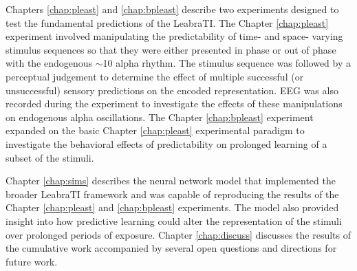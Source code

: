 \documentclass[dwyatte_dissertation.tex]{subfiles}
\begin{document}
Chapters \ref{chap:pleast} and \ref{chap:bpleast} describe two experiments designed to test the fundamental predictions of the LeabraTI. The Chapter \ref{chap:pleast} experiment involved manipulating the predictability of time- and space- varying stimulus sequences so that they were either presented in phase or out of phase with the endogenous $\sim$10 alpha rhythm. The stimulus sequence was followed by a perceptual judgement to determine the effect of multiple successful (or unsuccessful) sensory predictions on the encoded representation. EEG was also recorded during the experiment to investigate the effects of these manipulations on endogenous alpha oscillations. The Chapter \ref{chap:bpleast} experiment expanded on the basic Chapter \ref{chap:pleast} experimental paradigm to investigate the behavioral effects of predictability on prolonged learning of a subset of the stimuli.

Chapter \ref{chap:sims} describes the neural network model that implemented the broader LeabraTI framework and was capable of reproducing the results of the Chapter \ref{chap:pleast} and \ref{chap:bpleast} experiments. The model also provided insight into how predictive learning could alter the representation of the stimuli over prolonged periods of exposure. Chapter \ref{chap:discuss} discusses the results of the cumulative work accompanied by several open questions and directions for future work.
\end{document}
